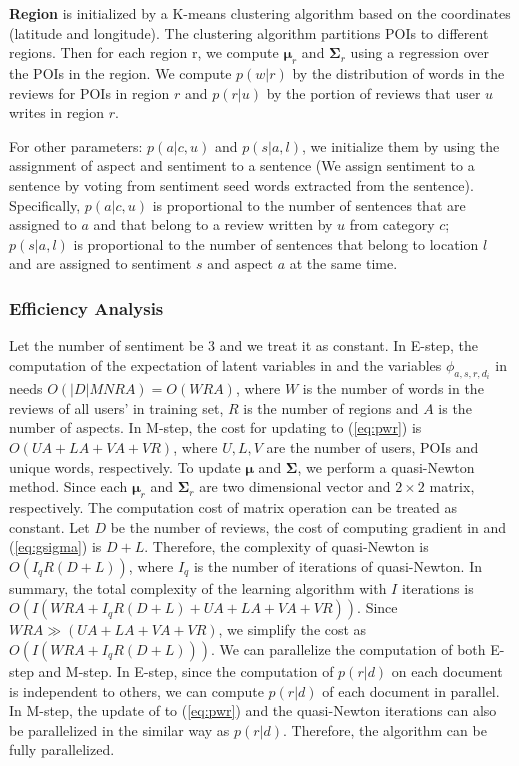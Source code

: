 \textbf{Region} is initialized by a K-means clustering
algorithm based on the coordinates (latitude and longitude).
The clustering algorithm partitions POIs to different
regions. Then for each region r, we compute $\boldsymbol{\mu}_r$
and $\boldsymbol{\Sigma}_r$ using a regression
over the POIs in the region.
We compute $p(w|r)$ by the distribution of
words in the reviews for POIs in region $r$ and $p(r|u)$ by the
portion of reviews that user $u$ writes in region $r$.

For other parameters: $p(a|c,u)$ and $p(s|a,l)$, we initialize
them by using the assignment of aspect and sentiment to a sentence
(We assign sentiment to a sentence by voting from sentiment seed words
extracted from the sentence). Specifically, $p(a|c,u)$ is proportional to the
number of sentences that are assigned to $a$ and that belong to a review
written by $u$ from category $c$; $p(s|a,l)$ is proportional to
the number of sentences that belong to location $l$ and
are assigned to sentiment $s$ and aspect $a$ at the same time.

\subsubsection{Efficiency Analysis}
Let the number of sentiment be 3 and we treat it as
constant. In E-step,
the computation of the expectation of latent variables in 
and the variables $\phi_{a,s,r,d_i}$ in 
needs $O(|D|MNRA)=O(WRA)$, where $W$ is the number of words in the reviews of all
users' in training set,
$R$ is the number of regions and $A$ is the number of aspects.
In M-step, the cost for updating  to (\ref{eq:pwr})
is $O(UA+LA+VA+VR)$,
where $U,L,V$ are the number of users, POIs and unique words, respectively.
To update $\boldsymbol{\mu}$ and $\boldsymbol{\Sigma}$, we perform a
quasi-Newton method. Since each $\boldsymbol{\mu}_r$ and $\boldsymbol{\Sigma}_r$
are two dimensional vector and $2\times2$ matrix, respectively. The computation cost of matrix operation
can be treated as constant. Let $D$ be the number of reviews, the cost of
computing gradient in  and (\ref{eq:gsigma})
is $D+L$.
Therefore, the complexity of quasi-Newton is $O(I_qR(D+L))$, where $I_q$
is the number of iterations of quasi-Newton.
In summary, the total complexity of the learning
algorithm with $I$ iterations is $O(I(WRA+I_qR(D+L)+UA+LA+VA+VR))$.
Since $WRA\gg (UA+LA+VA+VR)$, we simplify the cost as $O(I(WRA+I_qR(D+L)))$.
We can parallelize the computation
of both E-step and M-step. In E-step, since
the computation of $p(r|d)$ on each document is independent to others, we can compute $p(r|d)$
of each document in parallel. In M-step, the update of  to (\ref{eq:pwr}) and
the quasi-Newton iterations can also be
parallelized in the similar way as $p(r|d)$. Therefore, the algorithm can be fully parallelized.

